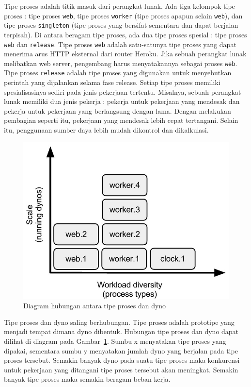 \documentclass[a4paper,twoside]{article}
\begin{document}
\begin{enumerate}
\begin{itemize}
\begin{itemize}
\begin{itemize}
				Tipe proses adalah titik masuk dari perangkat lunak. Ada tiga kelompok tipe proses : tipe proses \texttt{web}, tipe proses \texttt{worker} (tipe proses apapun selain \texttt{web}), dan tipe proses \texttt{singleton} (tipe proses yang bersifat sementara dan dapat berjalan terpisah). Di antara beragam tipe proses, ada dua tipe proses spesial : tipe proses \texttt{web} dan \texttt{release}. Tipe proses \texttt{web} adalah satu-satunya tipe proses yang dapat menerima arus HTTP eksternal dari router Heroku. Jika sebuah perangkat lunak melibatkan web server, pengembang harus menyatakannya sebagai proses \texttt{web}. Tipe proses \texttt{release} adalah tipe proses yang digunakan untuk menyebutkan perintah yang dijalankan selama fase release.
				Setiap tipe proses memiliki spesialisasinya sediri pada jenis pekerjaan tertentu. Misalnya, sebuah perangkat lunak memiliki dua jenis pekerja : pekerja untuk pekerjaan yang mendesak dan pekerja untuk pekerjaan yang berlangsung dengan lama. Dengan melakukan pembagian seperti itu, pekerjaan yang mendesak lebih cepat tertangani. Selain itu, penggunaan sumber daya lebih mudah dikontrol dan dikalkulasi.
				\begin{figure}[H]
					\centering  
					\includegraphics[scale=0.5]{Gambar/process-type-dyno-relationship.jpg}  
					\caption[Diagram hubungan antara tipe proses dan dyno]{Diagram hubungan antara tipe proses dan dyno} 
					\label{fig:process-type-dyno-relationship} 
				\end{figure}
				Tipe proses dan dyno saling berhubungan. Tipe proses adalah prototipe yang menjadi tempat dimana dyno dibentuk. Hubungan tipe proses dan dyno dapat dilihat di diagram pada Gambar~\ref{fig:process-type-dyno-relationship}. Sumbu x menyatakan tipe proses yang dipakai, sementara sumbu y menyatakan jumlah dyno yang berjalan pada tipe proses tersebut. Semakin banyak dyno pada suatu tipe proses maka konkurensi untuk pekerjaan yang ditangani tipe proses tersebut akan meningkat. Semakin banyak tipe proses maka semakin beragam beban kerja.
		

\end{itemize}
\end{itemize}
\end{itemize}
\end{enumerate}
\end{document}
